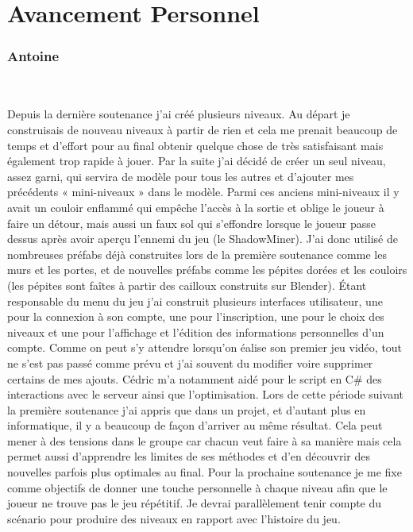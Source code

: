 \documentclass[titlepage, 13px, a4paper]{report}
\begin{document}
\newpage




\part{Avancement Personnel}  
\section{Antoine}
\paragraph{} \hspace{0pt} \\
Depuis la dernière soutenance j'ai créé plusieurs niveaux. 
Au départ je construisais de nouveau niveaux à partir de rien et cela me prenait beaucoup de temps et d'effort pour au final 
obtenir quelque chose de très satisfaisant mais également trop rapide à jouer. Par la suite j'ai décidé de créer un seul niveau, 
assez garni, qui servira de modèle pour tous les autres et d'ajouter mes précédents « mini-niveaux » dans le modèle. 
Parmi ces anciens mini-niveaux il y avait un couloir enflammé qui empêche l'accès à la sortie et oblige le joueur à faire un détour, 
mais aussi un faux sol qui s’effondre lorsque le joueur passe dessus après avoir aperçu l'ennemi du jeu (le ShadowMiner). J'ai donc 
utilisé de nombreuses préfabs déjà construites lors de la première soutenance comme les murs et les portes, et de nouvelles préfabs 
comme les pépites dorées et les couloirs (les pépites sont faîtes à partir des cailloux construits sur Blender). Étant responsable du 
menu du jeu j'ai construit plusieurs interfaces utilisateur, une pour la connexion à son compte, une pour l'inscription, une pour le 
choix des niveaux et une pour l'affichage et l’édition des informations personnelles d'un compte. Comme on peut s'y attendre lorsqu'on 
éalise son premier jeu vidéo, tout ne s'est pas passé comme prévu et j'ai souvent du modifier voire supprimer certains de mes ajouts. 
Cédric m'a notamment aidé pour le script en C\# des interactions avec le serveur ainsi que l'optimisation. Lors de cette période suivant 
la première soutenance j'ai appris que dans un projet, et d'autant plus en informatique, il y a beaucoup de façon d'arriver au même résultat. 
Cela peut mener à des tensions dans le groupe car chacun veut faire à sa manière mais cela permet aussi d'apprendre les limites de ses méthodes 
et d’en découvrir des nouvelles parfois plus optimales au final. Pour la prochaine soutenance je me fixe comme objectifs de donner
 une touche personnelle à chaque niveau afin que le joueur ne trouve pas le jeu répétitif. Je devrai parallèlement tenir compte 
 du scénario pour produire des niveaux en rapport avec l'histoire du jeu.
\end{document}
